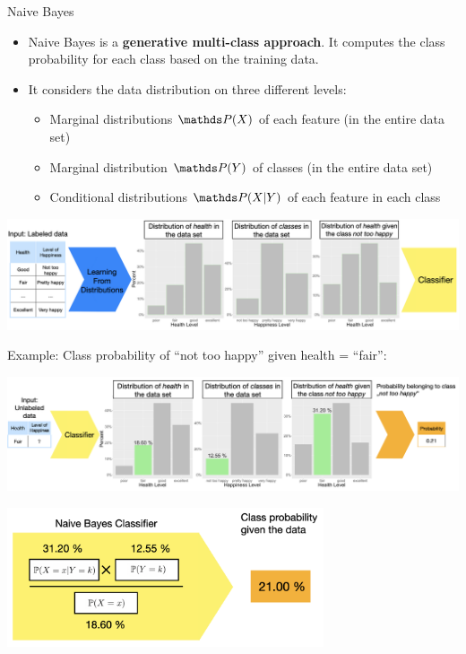 \documentclass[11pt,compress,t,notes=noshow, xcolor=table]{beamer}
\begin{document}
\begin{vbframe}{Naive Bayes}
\begin{itemize}
\item \small Naive Bayes is a \textbf{generative multi-class approach}. It computes the class probability for each class based on the training data.
\item \small It considers the data distribution on three different levels:
    \begin{itemize}
    \item \small Marginal distributions $\P(X)$ of each feature (in the entire data set)
    \item \small Marginal distribution $\P(Y)$ of classes (in the entire data set)
    \item \small Conditional distributions $\P(X|Y)$ of each feature in each class
    \end{itemize}
\vspace*{1cm}
\end{itemize}
\begin{center}
  \includegraphics[width=1\textwidth]{figure_man/nutshell-classif-distributions_learning.png}
\end{center}

\newpage
\small Example: Class probability of ``not too happy'' given health = ``fair'':

\begin{center}
  \includegraphics[width=1\textwidth]{figure_man/nutshell-classif-distributions-prediction.png}
\end{center}
\begin{center}
  \includegraphics[width=0.7\textwidth]{figure_man/nutshell-classif-naive-bayes-formula.png}
\end{center}

\end{vbframe}

\endlecture
\end{document}
